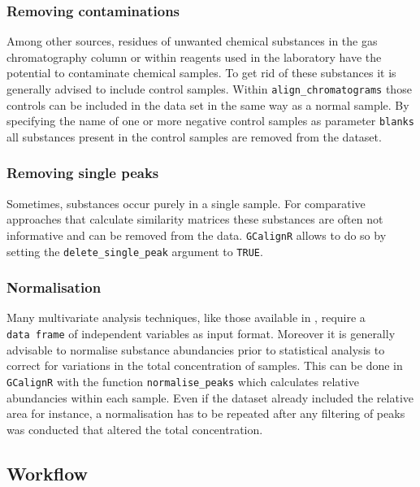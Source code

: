 \subsubsection{Removing contaminations}\label{removing-contaminations}

Among other sources, residues of unwanted chemical substances in the gas
chromatography column or within reagents used in the laboratory have the
potential to contaminate chemical samples. To get rid of these
substances it is generally advised to include control samples. Within
\texttt{align\_chromatograms} those controls can be included in the data
set in the same way as a normal sample. By specifying the name of one or
more negative control samples as parameter \texttt{blanks} all
substances present in the control samples are removed from the dataset.

\subsubsection{Removing single peaks}\label{removing-single-peaks}

Sometimes, substances occur purely in a single sample. For comparative
approaches that calculate similarity matrices these substances are often
not informative and can be removed from the data. \texttt{GCalignR}
allows to do so by setting the \texttt{delete\_single\_peak} argument to
\texttt{TRUE}.

\subsubsection{Normalisation}\label{normalisation}

Many multivariate analysis techniques, like those available in
, require a \texttt{data\ frame} of independent variables as
input format. Moreover it is generally advisable to normalise substance
abundancies prior to statistical analysis to correct for variations in
the total concentration of samples. This can be done in
\texttt{GCalignR} with the function \texttt{normalise\_peaks} which
calculates relative abundancies within each sample. Even if the dataset
already included the relative area for instance, a normalisation has to
be repeated after any filtering of peaks was conducted that altered the
total concentration.

\subsection{Workflow}\label{workflow}


